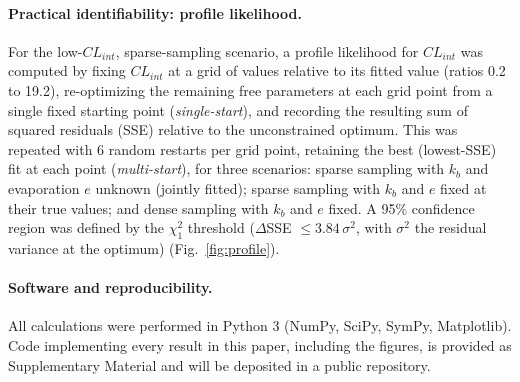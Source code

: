 \paragraph{Practical identifiability: profile likelihood.} For the low-$CL_{int}$, sparse-sampling scenario, a profile likelihood for $CL_{int}$ was computed by fixing $CL_{int}$ at a grid of values relative to its fitted value (ratios 0.2 to 19.2), re-optimizing the remaining free parameters at each grid point from a single fixed starting point (\emph{single-start}), and recording the resulting sum of squared residuals (SSE) relative to the unconstrained optimum. This was repeated with 6 random restarts per grid point, retaining the best (lowest-SSE) fit at each point (\emph{multi-start}), for three scenarios: sparse sampling with $k_b$ and evaporation $e$ unknown (jointly fitted); sparse sampling with $k_b$ and $e$ fixed at their true values; and dense sampling with $k_b$ and $e$ fixed. A 95\% confidence region was defined by the $\chi^2_1$ threshold ($\Delta$SSE $\le 3.84\,\sigma^2$, with $\sigma^2$ the residual variance at the optimum) (Fig.~\ref{fig:profile}).

\paragraph{Software and reproducibility.} All calculations were performed in Python 3 (NumPy, SciPy, SymPy, Matplotlib). Code implementing every result in this paper, including the figures, is provided as Supplementary Material and will be deposited in a public repository.
